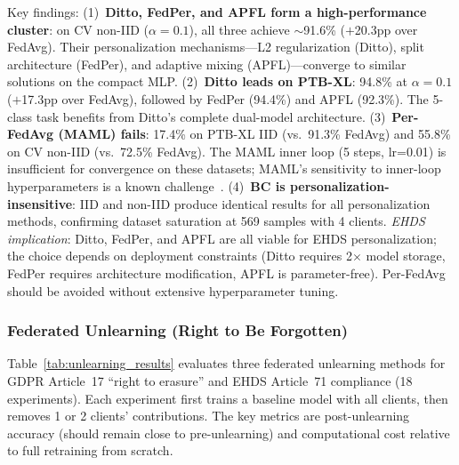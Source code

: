 \documentclass[conference]{IEEEtran}
\begin{document}
\begin{table}[htbp]
\vspace{1mm}
\footnotesize{Key findings: (1)~\textbf{Ditto, FedPer, and APFL form a high-performance cluster}: on CV non-IID ($\alpha{=}0.1$), all three achieve $\sim$91.6\% ($+$20.3pp over FedAvg). Their personalization mechanisms---L2 regularization (Ditto), split architecture (FedPer), and adaptive mixing (APFL)---converge to similar solutions on the compact MLP. (2)~\textbf{Ditto leads on PTB-XL}: 94.8\% at $\alpha{=}0.1$ ($+$17.3pp over FedAvg), followed by FedPer (94.4\%) and APFL (92.3\%). The 5-class task benefits from Ditto's complete dual-model architecture. (3)~\textbf{Per-FedAvg (MAML) fails}: 17.4\% on PTB-XL IID (vs.\ 91.3\% FedAvg) and 55.8\% on CV non-IID (vs.\ 72.5\% FedAvg). The MAML inner loop (5 steps, lr=0.01) is insufficient for convergence on these datasets; MAML's sensitivity to inner-loop hyperparameters is a known challenge~\cite{fallah2020personalized}. (4)~\textbf{BC is personalization-insensitive}: IID and non-IID produce identical results for all personalization methods, confirming dataset saturation at 569 samples with 4 clients. \textit{EHDS implication}: Ditto, FedPer, and APFL are all viable for EHDS personalization; the choice depends on deployment constraints (Ditto requires 2$\times$ model storage, FedPer requires architecture modification, APFL is parameter-free). Per-FedAvg should be avoided without extensive hyperparameter tuning.}
\end{table}

\subsubsection{Federated Unlearning (Right to Be Forgotten)}
\label{sec:unlearning_exp}

Table~\ref{tab:unlearning_results} evaluates three federated unlearning methods for GDPR Article~17 ``right to erasure'' and EHDS Article~71 compliance (18 experiments). Each experiment first trains a baseline model with all clients, then removes 1 or 2 clients' contributions. The key metrics are post-unlearning accuracy (should remain close to pre-unlearning) and computational cost relative to full retraining from scratch.
\end{document}
